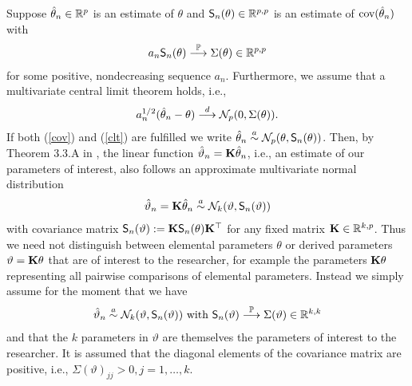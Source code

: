 \documentclass[12pt,a4paper]{article}
\begin{document}
Suppose $\hat{\theta}_n \in \mathbb{R}^p$ is an estimate of $\theta$ and
$\textsf{S}_n(\theta) \in \mathbb{R}^{p,p}$ is an estimate of $\text{cov}(\hat{\theta}_n)$ with
\begin{eqnarray} \label{cov}
a_n \textsf{S}_n(\theta) \stackrel{\mathbb{P}}{\longrightarrow} \Sigma(\theta) \in \mathbb{R}^{p,p}
\end{eqnarray}
for some positive, nondecreasing sequence $a_n$.
Furthermore, we assume that a multivariate central limit theorem holds,
i.e.,
\begin{eqnarray} \label{clt}
a_n^{1/2} (\hat{\theta}_n - \theta) \stackrel{d}{\longrightarrow} \mathcal{N}_p(0, \Sigma(\theta)).
\end{eqnarray}
If both (\ref{cov}) and (\ref{clt}) are fulfilled we write $\hat{\theta}_n \stackrel{a}{\sim}
\mathcal{N}_p(\theta, \textsf{S}_n(\theta))$. Then, by Theorem 3.3.A in
\cite{Serfling1980}, the linear function $\hat{\vartheta}_n = \mathbf{K}
\hat{\theta}_n$, i.e., an estimate of our parameters of interest, 
also follows an approximate multivariate normal 
distribution
\begin{eqnarray*}
\hat{\vartheta}_n = \mathbf{K} \hat{\theta}_n \stackrel{a}{\sim} \mathcal{N}_k(\vartheta, \textsf{S}_n(\vartheta))
\end{eqnarray*}
with covariance matrix $\textsf{S}_n(\vartheta) := \mathbf{K} \textsf{S}_n(\theta) \mathbf{K}^\top$
for any fixed matrix $\mathbf{K} \in \mathbb{R}^{k,p}$. Thus we need not distinguish
between elemental parameters $\theta$ or derived parameters $\vartheta = \mathbf{K} \theta$ 
that are of interest to the researcher, for example the parameters $\mathbf{K} \theta$ representing
all pairwise comparisons of elemental parameters. Instead we simply assume 
for the moment that we have 
\begin{eqnarray} \label{assume}
\hat{\vartheta}_n \stackrel{a}{\sim} \mathcal{N}_k(\vartheta, \textsf{S}_n(\vartheta)) \text{ with } 
\textsf{S}_n(\vartheta) \stackrel{\mathbb{P}}{\longrightarrow} \Sigma(\vartheta) \in \mathbb{R}^{k,k}
\end{eqnarray}
and that the $k$ parameters in $\vartheta$ are themselves the 
parameters of interest to the researcher. It is assumed that
the diagonal elements of the covariance matrix are positive, i.e., 
$\Sigma(\vartheta)_{jj} > 0, j = 1, \dots, k$.
\end{document}
